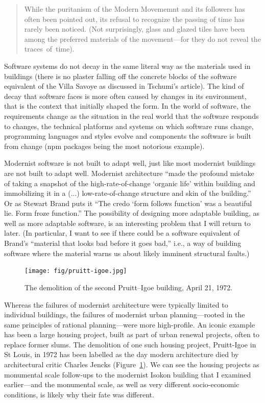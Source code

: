 \begin{quote}
While the puritanism of the Modern Movememnt and its followers has often been pointed out,
its refusal to recognize the passing of time has rarely been noticed. (Not surprisingly,
glass and glazed tiles have been among the preferred materials of the movement---for
they do not reveal the traces~of~time).
\end{quote}

Software systems do not decay in the same literal way as the materials used in buildings
(there is no plaster falling off the concrete blocks of the software equivalent of the
Villa Savoye as discussed in Tschumi's article). The kind of decay that software faces is more
often caused by changes in its environment, that is the context that initially shaped the form.
In the world of software, the requirements change as the situation in the real world that the
software responds to changes, the technical platforms and systems on which software runs change,
programming languages and styles evolve and components the software is built from change
(npm packages being the most notorious example).

Modernist software is not built to adapt well, just like most modernist buildings are not
built to adapt well. Modernist architecture ``made the profound mistake of taking a
snapshot of the high-rate-of-change `organic life' within building and immobilizing it
in a (...) low-rate-of-change structure and skin of the building.''
Or as Stewart Brand puts it ``The credo `form follows function' was a beautiful lie.
Form froze function.'' The possibility of designing more adaptable building,
as well as more adaptable software, is an interesting problem that I will return to later.
(In particular, I want to see if there could be a software equivalent of Brand's ``material
that looks bad before it goes bad,'' i.e., a way of building software where the material
warns us about likely imminent structural faults.)

\begin{figure}
  \centering
  \texttt{[image: fig/pruitt-igoe.jpg]}
  \caption{The demolition of the second Pruitt–Igoe building, April 21, 1972.}
  \label{fig:pruitt}
\end{figure}

Whereas the failures of modernist architecture were typically limited to individual buildings,
the failures of modernist urban planning---rooted in the same principles of rational
planning---were more high-profile. An iconic example has been a large housing project,
built as part of urban renewal projects, often to replace former slums. The demolition
of one such housing project, Pruitt-Igoe in St Louis, in 1972 has been labelled as the
day modern architecture died by architectural critic Charles Jencks (Figure~\ref{fig:pruitt}).
We can see the housing projects as monumental scale follow-ups to the modernist Isokon building
that I examined earlier---and the monumental scale, as well as very different socio-economic
conditions, is likely why their fate was different.

